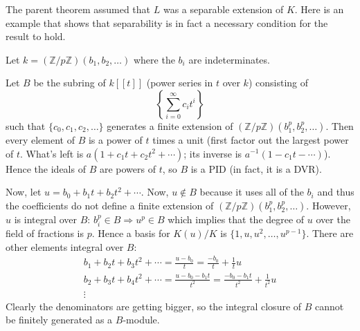 \documentclass[12pt]{article}
\newcommand{\Ints}{\mathbb{Z}}
\begin{document}
The parent theorem assumed that $L$ was a separable extension of $K$. Here is an example that shows that separability is in fact a necessary condition for the result to hold.


Let $k=(\Ints/p\Ints)(b_1,b_2,\ldots)$ where the $b_i$ are indeterminates.

Let $B$ be the subring of $k[[t]]$ (power series in $t$ over $k$) consisting of
\[\left\{\sum_{i=0}^{\infty} c_i t^i\right\}\]
such that $\{c_0,c_1,c_2,\ldots\}$ generates a finite extension of $(\Ints/p\Ints)(b^p_1,b^p_2,\ldots)$. Then every element of $B$ is a power of $t$ times a unit (first factor out the largest power of $t$. What's left is $a(1+c_1 t+c_2 t^2+\cdots)$; its inverse is $a^{-1}(1-c_1 t-\cdots)$). Hence the ideals of $B$ are powers of $t$, so $B$ is a PID (in fact, it is a DVR).

Now, let $u=b_0 + b_1 t+b_2 t^2+\cdots$. Now, $u\notin B$ because it uses all of the $b_i$ and thus the coefficients do not define a finite extension of $(\Ints/p\Ints)(b^p_1,b^p_2,\ldots)$. However, $u$ is integral over $B$: $b^p_i\in B\Rightarrow u^p\in B$ which implies that the degree of $u$ over the field of fractions is $p$. Hence a basis for $K(u)/K$ is $\{1,u,u^2,\ldots,u^{p-1}\}$. There are other elements integral over $B$:
\begin{gather*}
b_1+b_2 t+b_3 t^2+\cdots = \frac{u-b_0}{t}=\frac{-b_0}{t}+\frac{1}{t}u\\
b_2+b_3 t+b_4 t^2+\cdots = \frac{u-b_0-b_1 t}{t^2}=\frac{-b_0-b_1t}{t^2}+\frac{1}{t^2}u\\
\vdots
\end{gather*}
Clearly the denominators are getting bigger, so the integral closure of $B$ cannot be finitely generated as a $B$-module.

\end{document}
